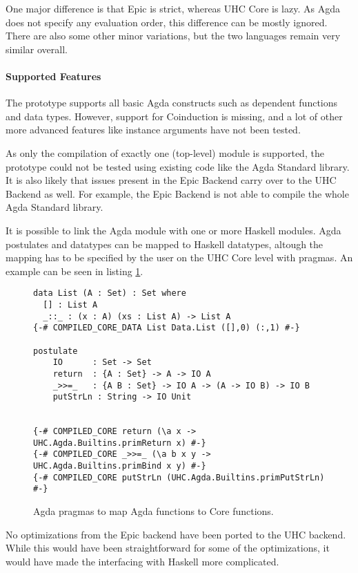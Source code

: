 \documentclass[12pt, a4paper, twoside]{report}
\begin{document}
One major difference is that Epic is strict, whereas UHC Core is lazy. As Agda does not specify
any evaluation order, this difference can be mostly ignored. There are also some other
minor variations, but the two languages remain very similar overall.

\paragraph{Supported Features}
The prototype supports all basic Agda constructs such as dependent functions and data types.
However, support for Coinduction is missing, and a lot of other more advanced features like instance arguments
have not been tested.

As only the compilation of exactly one (top-level) module is supported, the prototype could not
be tested using existing code like the Agda Standard library. It is also likely that issues
present in the Epic Backend carry over to the UHC Backend as well. For example, the Epic
Backend is not able to compile the whole Agda Standard library.

It is possible to link the Agda module with one or more Haskell modules. Agda postulates
and datatypes can be mapped to Haskell datatypes, altough the mapping has to be specified
by the user on the UHC Core level with pragmas. An example can be seen in listing \ref{lst:agda-hs-pragmas}.


\begin{figure}
\begin{lstlisting}
data List (A : Set) : Set where
  [] : List A
  _::_ : (x : A) (xs : List A) -> List A
{-# COMPILED_CORE_DATA List Data.List ([],0) (:,1) #-}

postulate
    IO      : Set -> Set
    return  : {A : Set} -> A -> IO A
    _>>=_   : {A B : Set} -> IO A -> (A -> IO B) -> IO B
    putStrLn : String -> IO Unit


{-# COMPILED_CORE return (\a x -> UHC.Agda.Builtins.primReturn x) #-}
{-# COMPILED_CORE _>>=_ (\a b x y -> UHC.Agda.Builtins.primBind x y) #-}
{-# COMPILED_CORE putStrLn (UHC.Agda.Builtins.primPutStrLn) #-}
\end{lstlisting}
\caption{Agda pragmas to map Agda functions to Core functions.}
\label{lst:agda-hs-pragmas}
\end{figure}

No optimizations from the Epic backend have been ported to the UHC backend. While this
would have been straightforward for some of the optimizations, it would have made the
interfacing with Haskell more complicated.
\end{document}

